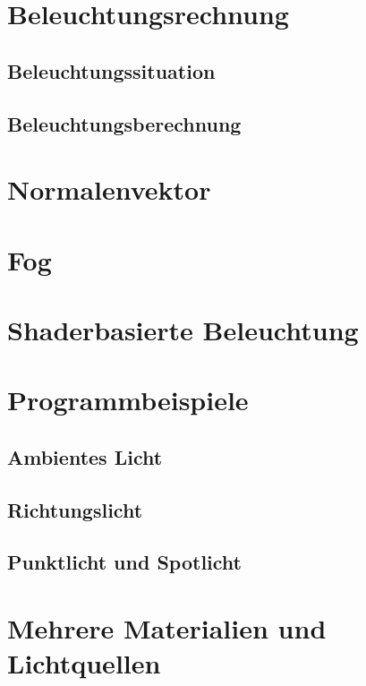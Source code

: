 \section{Beleuchtungsrechnung}
\subsection{Beleuchtungssituation}
\subsection{Beleuchtungsberechnung}

\section{Normalenvektor}

\section{Fog}

\section{Shaderbasierte Beleuchtung}

\section{Programmbeispiele}
\subsection{Ambientes Licht}
\subsection{Richtungslicht}
\subsection{Punktlicht und Spotlicht}

\section{Mehrere Materialien und Lichtquellen}


